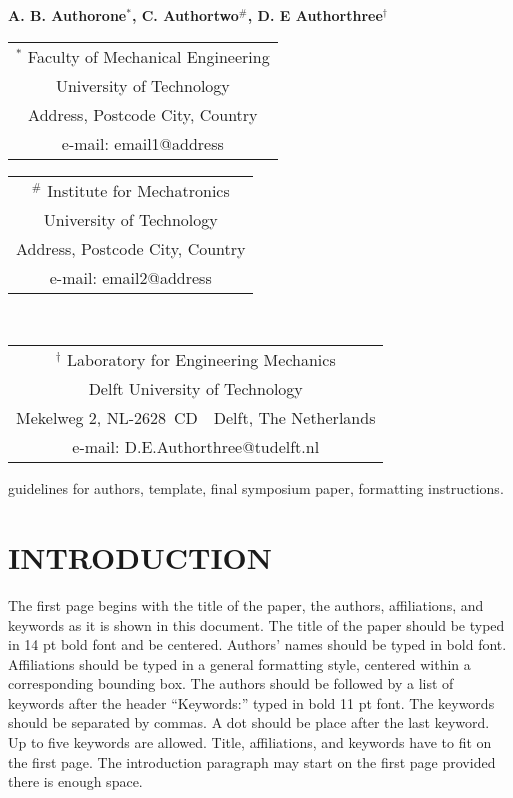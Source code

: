 \documentclass{icsc}
\begin{document}
\begin{center}
\end{center}

\begin{center}
  \normalsize{\bf{A. B. Authorone$^{*}$,
                  C. Authortwo$^\#$,
                  D. E Authorthree$^\dag$}}
\end{center}

\begin{center}
  \begin{tabular}{c}
    $^*$ Faculty of Mechanical Engineering\\
    University of Technology\\
    Address, Postcode City, Country\\
    e-mail: email1@address\\
  \end{tabular}
  \begin{tabular}{c}
    $^\#$ Institute for Mechatronics\\
     University of Technology\\
    Address, Postcode City, Country\\
    e-mail: email2@address\\
  \end{tabular} \\ \vspace{2.5ex}
  \begin{tabular}{c}
    $^\dag$ Laboratory for Engineering Mechanics\\
     Delft University of Technology\\
     Mekelweg 2, NL-2628~CD~~Delft, The Netherlands\\
     e-mail: D.E.Authorthree@tudelft.nl\\
  \end{tabular}
\end{center}

\begin{keywords}
guidelines for authors,
template,
final symposium paper,
formatting instructions.
\end{keywords}

\section{INTRODUCTION}
%
The first page begins with the title of the paper, the authors, affiliations,
and keywords as it is shown in this document. The title of the paper should be
typed in 14 pt bold font and be centered. Authors' names should be typed in
bold font. Affiliations should be typed in a general formatting style, centered
within a corresponding bounding box. The authors should be followed by a list
of keywords after the header ``Keywords:'' typed in bold 11 pt font. The
keywords should be separated by commas. A dot should be place after the last
keyword. Up to five keywords are allowed. Title, affiliations, and keywords
have to fit on the first page. The introduction paragraph may start on the
first page provided there is enough space.
\end{document}
